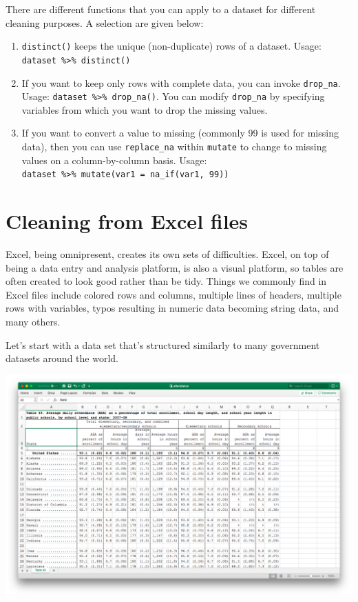 \documentclass[12pt,letterpaperpaper,openany]{book}
\providecommand{\tightlist}{%
  \setlength{\itemsep}{0pt}\setlength{\parskip}{0pt}}
\begin{document}
There are different functions that you can apply to a dataset for different cleaning purposes. A selection
are given below:

\begin{enumerate}
\def\labelenumi{\arabic{enumi}.}
\tightlist
\item
  \texttt{distinct()} keeps the unique (non-duplicate) rows of a dataset. Usage: \texttt{dataset\ \%\textgreater{}\%\ distinct()}
\item
  If you want to keep only rows with complete data, you can invoke \texttt{drop\_na}. Usage: \texttt{dataset\ \%\textgreater{}\%\ drop\_na()}. You
  can modify \texttt{drop\_na} by specifying variables from which you want to drop the missing values.
\item
  If you want to convert a value to missing (commonly 99 is used for missing data), then you can use \texttt{replace\_na} within \texttt{mutate} to change to missing values on a column-by-column basis. Usage: \texttt{dataset\ \%\textgreater{}\%\ mutate(var1\ =\ na\_if(var1,\ 99))}
\end{enumerate}

\hypertarget{cleaning-from-excel-files}{%
\section{Cleaning from Excel files}\label{cleaning-from-excel-files}}

Excel, being omnipresent, creates its own sets of difficulties. Excel, on top of being a data entry and
analysis platform, is also a visual platform, so tables are often created to look good rather than be tidy. Things
we commonly find in Excel files include colored rows and columns, multiple lines of headers, multiple rows with variables, typos resulting in numeric data becoming string data, and many others.

Let's start with a data set that's structured similarly to many government datasets around
the world.

\includegraphics{img/ExcelClean.png}
\end{document}

